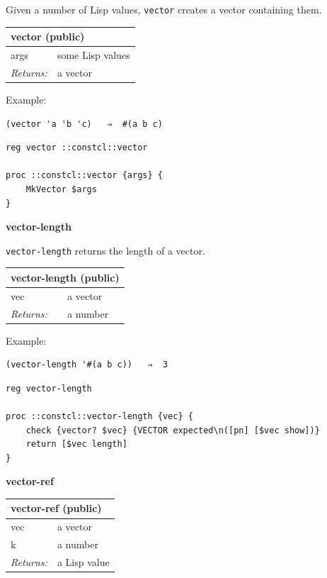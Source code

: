 \documentclass[twoside,9pt]{report}
\begin{document}
Given a number of Lisp values, \texttt{vector} creates a vector containing them.

\begin{tabular}{ |l l| }
\hline
\multicolumn{2}{|l|}{vector (public)} \\
\hline
args & some Lisp values \\
\textit{Returns:} & a vector \\
\hline
\end{tabular}


Example:

\noindent\makebox[\linewidth]{\rule{\linewidth}{0.4pt}}
\begin{lstlisting}
(vector 'a 'b 'c)   ⇒  #(a b c)
\end{lstlisting}
\noindent\makebox[\linewidth]{\rule{\linewidth}{0.4pt}}
\noindent\makebox[\linewidth]{\rule{\linewidth}{0.4pt}}
\begin{lstlisting}
reg vector ::constcl::vector
 
proc ::constcl::vector {args} {
    MkVector $args
}
\end{lstlisting}
\noindent\makebox[\linewidth]{\rule{\linewidth}{0.4pt}}

\textbf{vector-length}


\texttt{vector-length} returns the length of a vector.

\begin{tabular}{ |l l| }
\hline
\multicolumn{2}{|l|}{vector-length (public)} \\
\hline
vec & a vector \\
\textit{Returns:} & a number \\
\hline
\end{tabular}


Example:

\noindent\makebox[\linewidth]{\rule{\linewidth}{0.4pt}}
\begin{lstlisting}
(vector-length '#(a b c))   ⇒  3
\end{lstlisting}
\noindent\makebox[\linewidth]{\rule{\linewidth}{0.4pt}}
\noindent\makebox[\linewidth]{\rule{\linewidth}{0.4pt}}
\begin{lstlisting}
reg vector-length
 
proc ::constcl::vector-length {vec} {
    check {vector? $vec} {VECTOR expected\n([pn] [$vec show])}
    return [$vec length]
}
\end{lstlisting}
\noindent\makebox[\linewidth]{\rule{\linewidth}{0.4pt}}

\textbf{vector-ref}

\begin{tabular}{ |l l| }
\hline
\multicolumn{2}{|l|}{vector-ref (public)} \\
\hline
vec & a vector \\
k & a number \\
\textit{Returns:} & a Lisp value \\
\hline
\end{tabular}
\end{document}
